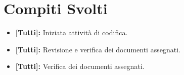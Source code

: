 \documentclass[../verbale-2017-03-20.tex]{subfiles}
\begin{document}
	\section{Compiti Svolti}
	\begin{itemize}
		\item \textbf{[Tutti]:} Iniziata attività di codifica.
		\item \textbf{[Tutti]:} Revisione e verifica dei documenti assegnati.
		\item \textbf{[Tutti]:} Verifica dei documenti assegnati.
	\end{itemize}
\end{document}
